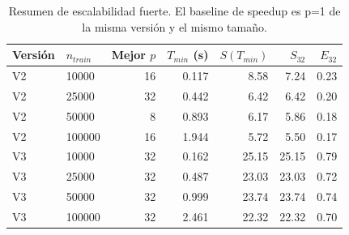 \begin{table}[H]
\centering
\begin{tabular}{llrrrrr}
\toprule
Versión & $n_{train}$ & Mejor $p$ & $T_{min}$ (s) & $S(T_{min})$ & $S_{32}$ & $E_{32}$ \\
\midrule
V2 & 10000 & 16 & 0.117 & 8.58 & 7.24 & 0.23 \\
V2 & 25000 & 32 & 0.442 & 6.42 & 6.42 & 0.20 \\
V2 & 50000 & 8 & 0.893 & 6.17 & 5.86 & 0.18 \\
V2 & 100000 & 16 & 1.944 & 5.72 & 5.50 & 0.17 \\
V3 & 10000 & 32 & 0.162 & 25.15 & 25.15 & 0.79 \\
V3 & 25000 & 32 & 0.487 & 23.03 & 23.03 & 0.72 \\
V3 & 50000 & 32 & 0.999 & 23.74 & 23.74 & 0.74 \\
V3 & 100000 & 32 & 2.461 & 22.32 & 22.32 & 0.70 \\
\bottomrule
\end{tabular}
\caption{Resumen de escalabilidad fuerte. El baseline de speedup es p=1 de la misma versión y el mismo tamaño.}
\label{tab:strong-summary}
\end{table}

